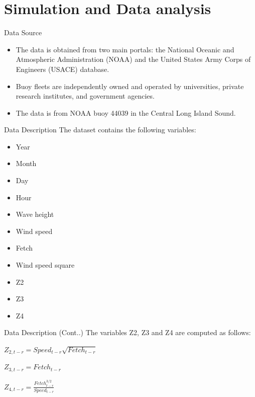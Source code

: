 \documentclass[
  ignorenonframetext,
]{beamer}
\begin{document}
\hypertarget{simulation-and-data-analysis}{%
\section{Simulation and Data
analysis}\label{simulation-and-data-analysis}}

\begin{frame}{Data Source}
\protect\hypertarget{data-source}{}
\begin{itemize}
\item
  The data is obtained from two main portals: the National Oceanic and
  Atmospheric Administration (NOAA) and the United States Army Corps of
  Engineers (USACE) database.
\item
  Buoy fleets are independently owned and operated by universities,
  private research institutes, and government agencies.
\item
  The data is from NOAA buoy 44039 in the Central Long Island Sound.
\end{itemize}
\end{frame}

\begin{frame}{Data Description}
\protect\hypertarget{data-description}{}
The dataset contains the following variables:

\begin{itemize}
\item
  Year
\item
  Month
\item
  Day
\item
  Hour
\item
  Wave height
\item
  Wind speed
\item
  Fetch
\item
  Wind speed square
\item
  Z2
\item
  Z3
\item
  Z4
\end{itemize}
\end{frame}

\begin{frame}{Data Description (Cont..)}
\protect\hypertarget{data-description-cont..}{}
The variables Z2, Z3 and Z4 are computed as follows:

\(Z_{2,t-r} = Speed_{t-r} \sqrt{Fetch_{t-r}}\)

\(Z_{3,t-r} = Fetch_{t-r}\)

\(Z_{4,t-r} = \frac{Fetch_{t-r}^{3/2}}{Speed_{t-r}}\)
\end{frame}
\end{document}
